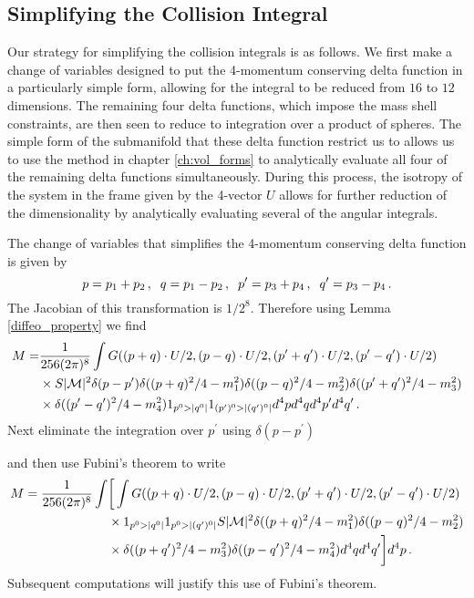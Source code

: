 \subsection{Simplifying the Collision Integral}\label{coll_simp_sec}
Our strategy for simplifying the collision integrals is as follows.  We first make a change of variables designed to put the 4-momentum conserving delta function in a particularly simple form, allowing for the integral to be reduced from $16$ to $12$ dimensions.  The remaining four delta functions, which impose the mass shell constraints, are then seen to reduce to integration over a product of spheres.  The simple form of the submanifold that these delta function restrict us to allows us to use the method in chapter \ref{ch:vol_forms} to analytically evaluate all four of the remaining delta functions simultaneously.  During this process, the isotropy of the system in the frame given by the 4-vector $U$ allows for further reduction of the dimensionality  by analytically evaluating several of the angular integrals. 

The change of variables that simplifies the 4-momentum conserving delta function is given by
\begin{equation}
p=p_1+p_2\,,\hspace{2mm} q=p_1-p_2\,, \hspace{2mm} p^{\prime}=p_3+p_4\,, \hspace{2mm} q^{\prime}=p_3-p_4\,.
\end{equation}
The Jacobian of this transformation is $1/2^{8}$.  Therefore using Lemma \ref{diffeo_property} we find
\begin{align}\label{M_eq1}
M=&\frac{1}{256(2\pi)^8 }\int   G((p+q)\cdot U/2,(p-q)\cdot  U/2,(p^{\prime}+q^{\prime})\cdot U/2, (p^{\prime}-q^{\prime})\cdot U/2)\notag\\ 
&\times S |\mathcal{M}|^2  \delta(p-p^{\prime})\delta((p+q)^2/4-m_1^2)\delta((p-q)^2/4-m_2^2)\delta((p^{\prime}+q^{\prime})^2/4-m_3^2)\notag\\
&\times\delta((p^{\prime}-q^{\prime})^2/4-m_4^2)1_{p^0>|q^0|} 1_{(p^{\prime})^0>|(q^{\prime})^0|}d^4pd^4qd^4p^{\prime}d^4q^{\prime}\,.
\end{align}
Next eliminate the integration over $p^{\prime}$ using $\delta(p-p^{\prime})$
 \begin{comment} 
using associative property
\end{comment}
 and then use Fubini's theorem to write
\begin{align}\label{use_fubini}
M=\frac{1}{256(2\pi)^8 }\int &\bigg[ \int G((p+q)\cdot U/2,(p-q)\cdot  U/2,(p^{\prime}+q^{\prime})\cdot U/2, (p^{\prime}-q^{\prime})\cdot U/2)\notag\\ 
&\times  1_{p^0>|q^0|} 1_{p^0>|(q^{\prime})^0|}S |\mathcal{M}|^2 \delta((p+q)^2/4-m_1^2)\delta((p-q)^2/4-m_2^2)\notag\\
&\times \delta((p+q^{\prime})^2/4-m_3^2)\delta((p-q^{\prime})^2/4-m_4^2)d^4qd^4q^{\prime}\bigg]d^4p\,.
\end{align}
Subsequent computations will justify this use of Fubini's theorem.


